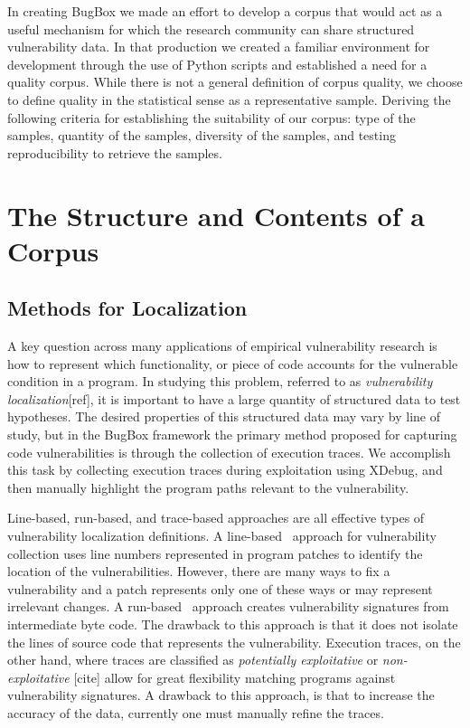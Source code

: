 \documentclass[letterpaper,twocolumn,10pt]{article}
\begin{document}
In creating BugBox we made an effort to develop a corpus that would act as a useful mechanism for which the research community can share structured vulnerability data.  In that production we created a familiar environment for development through the use of Python scripts and established a need for a quality corpus.  While there is not a general definition of corpus quality, we choose to define quality in the statistical sense as a representative sample.  Deriving the following criteria for establishing the suitability of our corpus: type of the samples, quantity of the samples, diversity of the samples, and testing reproducibility to retrieve the samples.
 
\section {The Structure and Contents of a Corpus}

\subsection{Methods for Localization}

A key question across many applications of empirical vulnerability research is how to represent which functionality, or piece of code accounts for the vulnerable condition in a program. In studying this problem, referred to as \emph{vulnerability localization}[ref], it is important to have a large quantity of structured data to test hypotheses. The desired properties of this structured data may vary by line of study, but in the BugBox framework the primary method proposed for capturing code vulnerabilities is through the collection of execution traces. We accomplish this task by collecting execution traces during exploitation using XDebug, and then manually highlight the program paths relevant to the vulnerability.\par 
Line-based, run-based, and trace-based approaches are all effective types of vulnerability localization definitions. A line-based~\cite{4630094} approach for vulnerability collection uses line numbers represented in program patches to identify the location of the vulnerabilities.  However, there are many ways to fix a vulnerability and a patch represents only one of these ways or may represent irrelevant changes.  A run-based~\cite{Song:2008:BNA:1496255.1496257} approach creates vulnerability signatures from intermediate byte code. The drawback to this approach is that it does not isolate the lines of source code that represents the vulnerability. Execution traces, on the other hand, where traces are classified as \emph{potentially exploitative} or \emph{non-exploitative} [cite] allow for great flexibility matching programs against vulnerability signatures. A drawback to this approach, is that to increase the accuracy of the data, currently one must manually refine the traces.   \par
\end{document}
